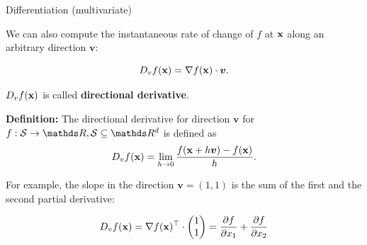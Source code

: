 \begin{vbframe}{Differentiation (multivariate)}
\framebreak 

We can also compute the instantaneous rate of change of $f$ at $\mathbf{x}$ along an arbitrary direction $\bm{v}$: 

$$
D_v f(\mathbf{x}) = \nabla f(\mathbf{x}) \cdot \bm v.
$$


$D_v f(\mathbf{x})$ is called \textbf{directional derivative}. 

\textbf{Definition:} The directional derivative for direction $\bm{v}$ for $f: \mathcal{S} \to \R, \mathcal{S} \subseteq \R^d$ is defined as
 $$
   D_v f(\mathbf{x}) = \lim_{h \to 0} \frac{f(\mathbf{x} + h \bm v) - f(\mathbf{x})}{h}.
 $$

\lz 

For example, the slope in the direction $\bm{v} = (1, 1)$ is the sum of the first and the second partial derivative: 

$$
D_v f(\mathbf{x}) = \nabla f(\mathbf{x})^\top \cdot \begin{pmatrix} 1 \\1\end{pmatrix} = \frac{\partial f}{\partial x_1} + \frac{\partial f}{\partial x_2}
$$

\end{vbframe}


\endlecture
